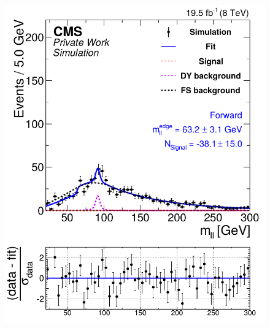 \begin{figure}[hbp]
\begin{minipage}[t]{0.49\textwidth}
    \includegraphics[width=\textwidth]{plots/results/fit/mcFits/fit2012_ETHTriangle_SignalInclusive_Combined_Full2012_ETHTriangle_MC_Forward.pdf}
  \end{minipage}
  \begin{minipage}[t]{0.49\textwidth}

\end{minipage}
\end{figure}
